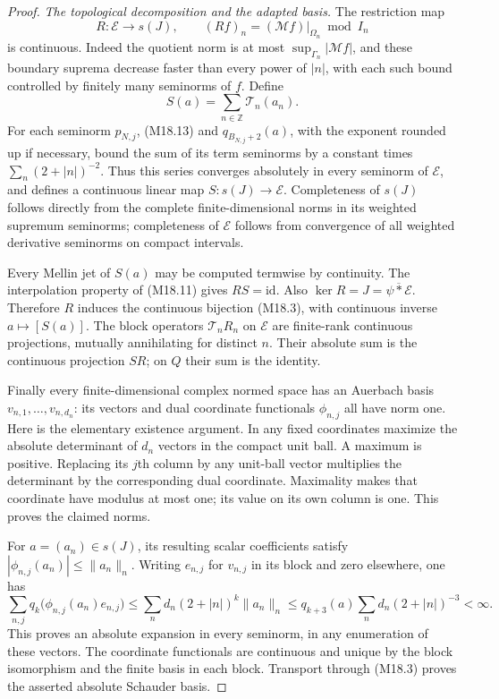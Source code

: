 \documentclass[11pt,a4paper]{article}
\begin{document}
\begin{proof}
\emph{The topological decomposition and the adapted basis.}
The restriction map
\[
 R:\mathcal E\longrightarrow s(J),\qquad
        (Rf)_n=(\mathcal Mf)|_{\Omega_n}\bmod I_n
\]
is continuous.  Indeed the quotient norm is at most
\(\sup_{\Gamma_n}|\mathcal Mf|\), and these boundary
suprema decrease faster than every power of \(|n|\),
with each such bound controlled by finitely many
seminorms of \(f\).  Define
\[
                    S(a)=\sum_{n\in\mathbb Z}\mathcal T_n(a_n).
\]
For each seminorm \(p_{N,j}\), (M18.13) and
\(q_{B_{N,j}+2}(a)\), with the exponent rounded up
if necessary, bound the sum of its term seminorms
by a constant times \(\sum_n(2+|n|)^{-2}\).
Thus this series converges absolutely in every
seminorm of \(\mathcal E\), and defines a continuous
linear map \(S:s(J)\to\mathcal E\).
Completeness of \(s(J)\) follows directly from the
complete finite-dimensional norms in its weighted
supremum seminorms; completeness of \(\mathcal E\)
follows from convergence of all weighted derivative
seminorms on compact intervals.

Every Mellin jet of \(S(a)\) may be computed
termwise by continuity.  The interpolation property
of (M18.11) gives \(RS=\mathrm{id}\).
Also \(\ker R=J=\overline{\psi*\mathcal E}\).
Therefore \(R\) induces the continuous bijection
(M18.3), with continuous inverse
\(a\mapsto[S(a)]\).
The block operators \(\mathcal T_n R_n\) on \(\mathcal E\)
are finite-rank continuous projections, mutually
annihilating for distinct \(n\).
Their absolute sum is the continuous projection
\(SR\); on \(Q\) their sum is the identity.

Finally every finite-dimensional complex normed
space has an Auerbach basis \(v_{n,1},\ldots,v_{n,d_n}\):
its vectors and dual coordinate functionals
\(\phi_{n,j}\) all have norm one.
Here is the elementary existence argument.  In
any fixed coordinates maximize the absolute
determinant of \(d_n\) vectors in the compact unit
ball.  A maximum is positive.  Replacing its
\(j\)th column by any unit-ball vector multiplies
the determinant by the corresponding dual
coordinate.  Maximality makes that coordinate
have modulus at most one; its value on its own
column is one.  This proves the claimed norms.

For \(a=(a_n)\in s(J)\), its resulting scalar
coefficients satisfy
\(|\phi_{n,j}(a_n)|\le\|a_n\|_n\).
Writing \(e_{n,j}\) for \(v_{n,j}\) in its block
and zero elsewhere, one has
\[
 \sum_{n,j}q_k\bigl(\phi_{n,j}(a_n)e_{n,j}\bigr)
 \le\sum_n d_n(2+|n|)^k\|a_n\|_n
 \le q_{k+3}(a)\sum_n d_n(2+|n|)^{-3}<\infty .
\]
This proves an absolute expansion in every
seminorm, in any enumeration of these vectors.
The coordinate functionals are continuous and
unique by the block isomorphism and the finite
basis in each block.  Transport through (M18.3)
proves the asserted absolute Schauder basis.
\end{proof}
\end{document}
